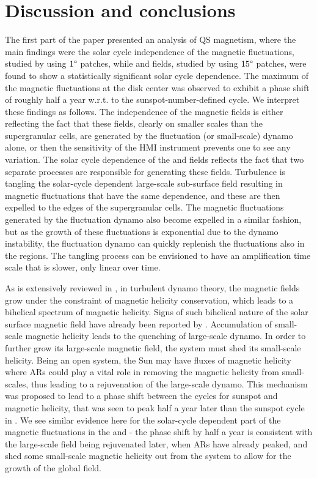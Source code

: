 \documentclass{aa}
\begin{document}
\section{Discussion and conclusions}

The first part of the paper presented an analysis of QS magnetism, where the main findings were the solar cycle independence of the \IN{} magnetic fluctuations, studied by using $1\degree$ patches, while \NW{} and \IN{} fields, studied by using $15 \degree$ patches, were found to show a statistically significant solar cycle dependence. The maximum of the magnetic fluctuations at the disk center was observed to exhibit a phase shift of roughly half a year w.r.t. to the sunspot-number-defined cycle. We interpret these findings as follows. The independence of the \IN{} magnetic fields is either reflecting the fact that these fields, clearly on smaller scales than the supergranular cells, are generated by the fluctuation (or small-scale) dynamo alone, or then the sensitivity of the HMI instrument prevents one to see any variation. The solar cycle dependence of the \NW{} and \IN{} fields reflects the fact that two separate processes are responsible for generating these fields. Turbulence is tangling the solar-cycle dependent large-scale sub-surface field resulting in magnetic fluctuations that have the same dependence, and these are then expelled to the edges of the supergranular cells. The magnetic fluctuations generated by the fluctuation dynamo also become expelled in a similar fashion, but as the growth of these fluctuations is exponential due to the dynamo instability, the fluctuation dynamo can quickly replenish the fluctuations also in the \IN{} regions. The tangling process can be envisioned to have an amplification time scale that is slower, only linear over time.

As is extensively reviewed in \cite{BS05}, in turbulent dynamo theory, the magnetic fields grow under the constraint of magnetic helicity
conservation, which leads to a bihelical spectrum of magnetic helicity. Signs of such bihelical nature of the solar surface magnetic field have already been reported by \citet{B+17,S+18}. Accumulation of small-scale
magnetic helicity leads to the quenching of large-scale dynamo. In order to further grow its large-scale
magnetic field, the system must shed its small-scale helicity. Being an open system, the Sun
may have fluxes of magnetic helicity where ARs could play a vital role in removing the magnetic
helicity from small-scales, thus leading to a rejuvenation of
the
large-scale dynamo. This mechanism was proposed to lead to a phase shift 
between the cycles for sunspot and magnetic helicity,
that was seen to peak half a year later than the sunspot cycle in \cite{S+18}. We see similar evidence here for the solar-cycle dependent part of the magnetic fluctuations in the \NW{} and \IN{} - the phase shift by half a year is consistent with the large-scale field being rejuvenated later, when ARs have already peaked, and shed some small-scale magnetic helicity out from the system to allow for the growth of the global field.
\end{document}
